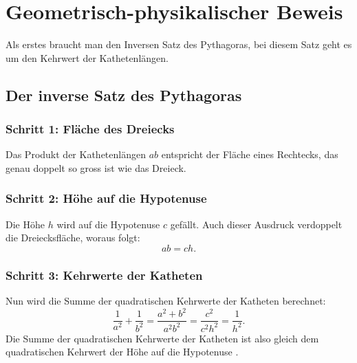 %
%
%
%
\section{Geometrisch-physikalischer Beweis
\label{basel:section:geometrisch-physikalischer-beweis}}

Als erstes braucht man den Inversen Satz des Pythagoras, bei diesem Satz geht es
um den Kehrwert der Kathetenlängen.

\subsection{Der inverse Satz des Pythagoras}
\label{basel:subsection:traverser-pythagoras}
%



\subsubsection{Schritt 1: Fläche des Dreiecks}
Das Produkt der Kathetenlängen $ab$ entspricht der Fläche eines Rechtecks,
das genau doppelt so gross ist wie das Dreieck.



\subsubsection{Schritt 2: Höhe auf die Hypotenuse}
Die Höhe $h$ wird auf die Hypotenuse $c$ gefällt.
Auch dieser Ausdruck verdoppelt die Dreiecksfläche, woraus folgt:
\[
ab = ch.
\]



\subsubsection{Schritt 3: Kehrwerte der Katheten}
Nun wird die Summe der quadratischen Kehrwerte der Katheten berechnet:
\[
\frac{1}{a^2} + \frac{1}{b^2}
=
\frac{a^2 + b^2}{a^2 b^2}
=
\frac{c^2}{c^2 h^2}
=
\frac{1}{h^2}.
\]
Die Summe der quadratischen Kehrwerte der Katheten ist also gleich dem
quadratischen Kehrwert der Höhe auf die Hypotenuse \cite{basel:Wikipedia2}.



